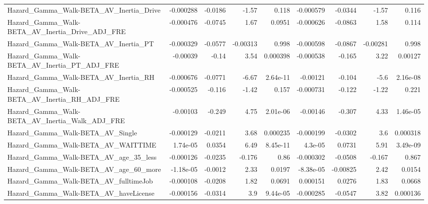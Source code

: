 \begin{tabular}{lrrrrrrrr}
Hazard\_Gamma\_Walk-BETA\_AV\_Inertia\_Drive            &   -0.000288 &      -0.0186 &    -1.57 &    0.118 &  -0.000579 &     -0.0344 &        -1.57 &         0.116 \\
Hazard\_Gamma\_Walk-BETA\_AV\_Inertia\_Drive\_ADJ\_FRE    &   -0.000476 &      -0.0745 &     1.67 &   0.0951 &  -0.000626 &     -0.0863 &         1.58 &         0.114 \\
Hazard\_Gamma\_Walk-BETA\_AV\_Inertia\_PT               &   -0.000329 &      -0.0577 & -0.00313 &    0.998 &  -0.000598 &     -0.0867 &     -0.00281 &         0.998 \\
Hazard\_Gamma\_Walk-BETA\_AV\_Inertia\_PT\_ADJ\_FRE       &    -0.00039 &        -0.14 &     3.54 & 0.000398 &  -0.000538 &      -0.165 &         3.22 &       0.00127 \\
Hazard\_Gamma\_Walk-BETA\_AV\_Inertia\_RH               &   -0.000676 &      -0.0771 &    -6.67 & 2.64e-11 &   -0.00121 &      -0.104 &         -5.6 &      2.16e-08 \\
Hazard\_Gamma\_Walk-BETA\_AV\_Inertia\_RH\_ADJ\_FRE       &   -0.000525 &       -0.116 &    -1.42 &    0.157 &  -0.000731 &      -0.122 &        -1.22 &         0.221 \\
Hazard\_Gamma\_Walk-BETA\_AV\_Inertia\_Walk\_ADJ\_FRE     &    -0.00103 &       -0.249 &     4.75 & 2.01e-06 &   -0.00146 &      -0.307 &         4.33 &      1.46e-05 \\
Hazard\_Gamma\_Walk-BETA\_AV\_Single                   &   -0.000129 &      -0.0211 &     3.68 & 0.000235 &  -0.000199 &     -0.0302 &          3.6 &      0.000318 \\
Hazard\_Gamma\_Walk-BETA\_AV\_WAITTIME                 &    1.74e-05 &       0.0354 &     6.49 & 8.45e-11 &    4.3e-05 &      0.0731 &         5.91 &      3.49e-09 \\
Hazard\_Gamma\_Walk-BETA\_AV\_age\_35\_less              &   -0.000126 &      -0.0235 &   -0.176 &     0.86 &  -0.000302 &     -0.0508 &       -0.167 &         0.867 \\
Hazard\_Gamma\_Walk-BETA\_AV\_age\_60\_more              &   -1.18e-05 &      -0.0012 &     2.33 &   0.0197 &  -8.38e-05 &    -0.00825 &         2.42 &        0.0154 \\
Hazard\_Gamma\_Walk-BETA\_AV\_fulltimeJob              &   -0.000108 &      -0.0208 &     1.82 &   0.0691 &   0.000151 &      0.0276 &         1.83 &        0.0668 \\
Hazard\_Gamma\_Walk-BETA\_AV\_haveLicense              &   -0.000156 &      -0.0314 &      3.9 & 9.44e-05 &  -0.000285 &     -0.0547 &         3.82 &      0.000136 \\

\end{tabular}

